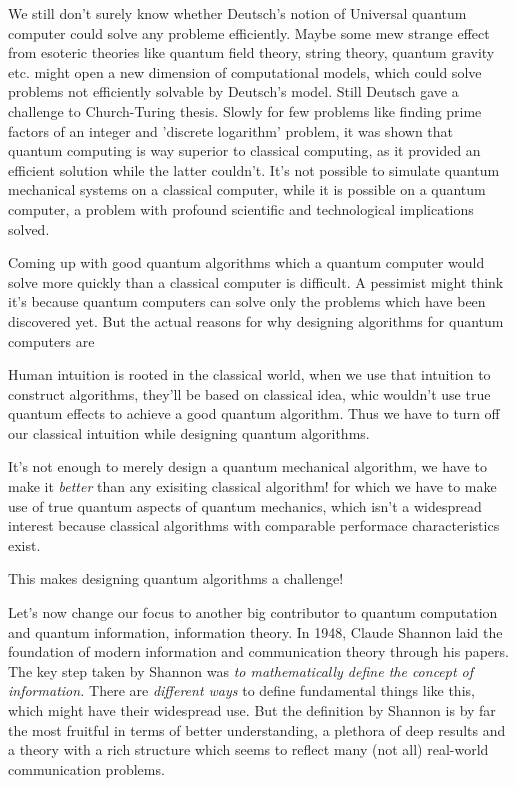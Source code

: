We still don't surely know whether Deutsch's notion of Universal quantum computer could solve any probleme efficiently. Maybe some mew strange effect from esoteric theories like quantum field theory, string theory, quantum gravity etc. might open a new dimension of computational models, which could solve problems not efficiently solvable by Deutsch's model. Still Deutsch gave a challenge to Church-Turing thesis. Slowly for few problems like finding prime factors of an integer and 'discrete logarithm' problem, it was shown that quantum computing is way superior to classical computing, as it provided an efficient solution while the latter couldn't. It's not possible to simulate quantum mechanical systems on a classical computer, while it is possible on a quantum computer, a problem with profound scientific and technological implications solved.

Coming up with good quantum algorithms which a quantum computer would solve more quickly than a classical computer is difficult. A pessimist might think it's because quantum computers can solve only the problems which have been discovered yet.  But the actual reasons for why designing algorithms for quantum computers are \begin{enumerate*}[label=(\alph*)]
    \item Human intuition is rooted in the classical world, when we use that intuition to construct  algorithms, they'll  be based on classical idea, whic wouldn't use true quantum effects to achieve a good quantum algorithm. Thus we have to turn off our classical intuition while designing quantum algorithms.
    \item  It's not enough to merely design a quantum mechanical algorithm, we have to make it \textit{better} than any exisiting classical algorithm! for which we have to make use of true quantum aspects of quantum mechanics, which isn't a widespread interest because classical algorithms with comparable performace characteristics exist.
\end{enumerate*}
This makes designing quantum algorithms a challenge!

Let's now change our focus to another big contributor to quantum computation and quantum information, information theory. In 1948, Claude Shannon laid the foundation of modern information and communication theory through his papers. The key step taken by Shannon was \textit{to mathematically define the concept of information.} There are \textit{different ways} to define fundamental things like this, which might have their widespread use. But the definition by Shannon is by far the most fruitful in terms of better understanding, a plethora of deep results and a theory with a rich structure which seems to reflect many (not all) real-world communication problems.

